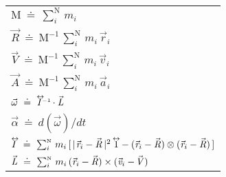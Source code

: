 \documentclass[10pt]{article}
\begin{document}
\par \bigskip\smallskip \hspace{-2.40em} \begin{tabular}{l}
${\mathrm{M}} ~\doteq~ \sum_i^{\scriptscriptstyle{\mathrm{N}}} \, m_i$ \vspace{+1.20em} \\
${\vec{\mathit{R}}} ~\doteq~ {\mathrm{M}}^{\scriptscriptstyle -1} \, \sum_i^{\scriptscriptstyle{\mathrm{N}}} \, m_i \, {\vec{\mathit{r}}_{i}}$ \vspace{+1.20em} \\
${\vec{\mathit{V}}} ~\doteq~ {\mathrm{M}}^{\scriptscriptstyle -1} \, \sum_i^{\scriptscriptstyle{\mathrm{N}}} \, m_i \, {\vec{\mathit{v}}_{i}}$ \vspace{+1.20em} \\
${\vec{\mathit{A}}} ~\doteq~ {\mathrm{M}}^{\scriptscriptstyle -1} \, \sum_i^{\scriptscriptstyle{\mathrm{N}}} \, m_i \, {\vec{\mathit{a}}_{i}}$ \vspace{+1.20em} \\
${\vec{\omega}} ~\doteq~ {\mathit{I}}^{\scriptscriptstyle -1}{\vphantom{\sum_1^2}}^{\hspace{-1.500em}\leftrightarrow}\hspace{+0.600em} \cdot {\vec{\mathit{L}}}$ \vspace{+1.20em} \\
${\vec{\alpha}} ~\doteq~ d({\vec{\omega}})/dt$ \vspace{+1.20em} \\
${\mathit{I}}{\vphantom{\sum_1^2}}^{\hspace{-0.555em}\leftrightarrow}\hspace{-0.210em} ~\doteq~ \sum_i^{\scriptscriptstyle{\mathrm{N}}} \, m_i \, [ \, |\hspace{+0.090em}{\vec{\mathit{r}}_{i}} - {\vec{\mathit{R}}}\,|^2 \hspace{+0.309em} {\mathrm{1}}{\vphantom{\sum_1^2}}^{\hspace{-0.639em}\leftrightarrow}\hspace{-0.129em} - ({\vec{\mathit{r}}_{i}} - {\vec{\mathit{R}}}) \otimes ({\vec{\mathit{r}}_{i}} - {\vec{\mathit{R}}}) \, ]$ \vspace{+1.20em} \\
${\vec{\mathit{L}}} ~\doteq~ \sum_i^{\scriptscriptstyle{\mathrm{N}}} \, m_i \, ({\vec{\mathit{r}}_{i}} - {\vec{\mathit{R}}}) \times ({\vec{\mathit{v}}_{i}} - \hspace{-0.120em}{\vec{\mathit{V}}})$
\end{tabular}
\end{document}
